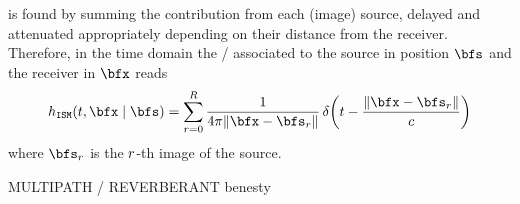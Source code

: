 



 is found by summing the contribution from each (image) source, delayed and attenuated appropriately depending on their distance from the receiver.
Therefore, in the time domain the \RIR/ associated to the source in position $\positionSource$ and the receiver in $\positionMicrophone$ reads
\begin{equation}\label{eq:acoustics:ims}
    \rir_{\mathtt{ISM}}(t, \positionMicrophone \mid \positionSource) =
    \sum_{\idxEch=0}^{\numEchs}
        \frac{1}{4 \pi \norm{\positionMicrophone - \positionSource_\idxEch}}
        \diracOf{t - \frac{\norm{\positionMicrophone - \positionSource_\idxEch}}{\speedOfSound}}
\end{equation}
where $\positionSource_\idxEch$ is the $r$-th image of the source.

MULTIPATH \vs/ REVERBERANT benesty


